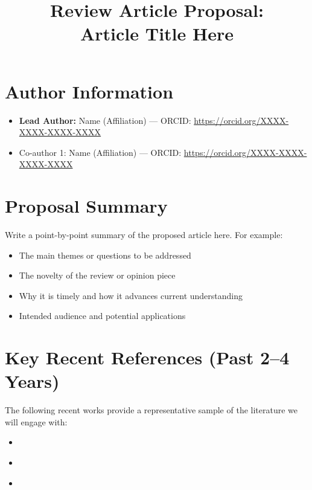 \documentclass[12pt]{article}
\title{\textbf{Review Article Proposal:\\[0.5em] \Large Article Title Here}}
\author{}
\date{}
\begin{document}
\maketitle

\section*{Author Information}
\begin{itemize}[leftmargin=1.5em]
    \item \textbf{Lead Author:} Name (Affiliation) — ORCID: \href{https://orcid.org/XXXX-XXXX-XXXX-XXXX}{https://orcid.org/XXXX-XXXX-XXXX-XXXX}
    \item Co-author 1: Name (Affiliation) — ORCID: \href{https://orcid.org/XXXX-XXXX-XXXX-XXXX}{https://orcid.org/XXXX-XXXX-XXXX-XXXX}
\end{itemize}


\section*{Proposal Summary}
Write a point-by-point summary of the proposed article here. For example:
\begin{itemize}[leftmargin=1.5em]
    \item The main themes or questions to be addressed
    \item The novelty of the review or opinion piece
    \item Why it is timely and how it advances current understanding
    \item Intended audience and potential applications
\end{itemize}

\section*{Key Recent References (Past 2–4 Years)}
The following recent works provide a representative sample of the literature we will engage with:
\begin{itemize}[leftmargin=1.5em]
    \item \cite{maurer2024landscape}
    \item \cite{key2}
    \item \cite{key3}
\end{itemize}
\end{document}
